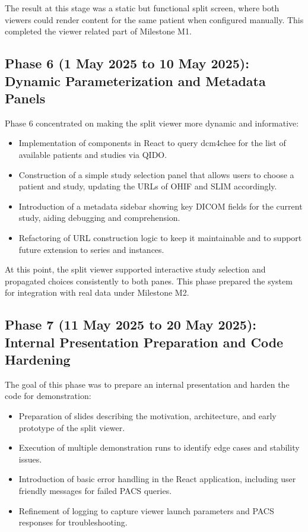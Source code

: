 \documentclass[11pt,a4paper]{article}
\begin{document}
The result at this stage was a static but functional split screen, where both viewers could render content for the same patient when configured manually. This completed the viewer related part of Milestone M1.

\subsection*{Phase 6 (1 May 2025 to 10 May 2025): Dynamic Parameterization and Metadata Panels}

Phase 6 concentrated on making the split viewer more dynamic and informative:

\begin{itemize}
    \item Implementation of components in React to query dcm4chee for the list of available patients and studies via QIDO.
    \item Construction of a simple study selection panel that allows users to choose a patient and study, updating the URLs of OHIF and SLIM accordingly.
    \item Introduction of a metadata sidebar showing key DICOM fields for the current study, aiding debugging and comprehension.
    \item Refactoring of URL construction logic to keep it maintainable and to support future extension to series and instances.
\end{itemize}

At this point, the split viewer supported interactive study selection and propagated choices consistently to both panes. This phase prepared the system for integration with real data under Milestone M2.

\subsection*{Phase 7 (11 May 2025 to 20 May 2025): Internal Presentation Preparation and Code Hardening}

The goal of this phase was to prepare an internal presentation and harden the code for demonstration:

\begin{itemize}
    \item Preparation of slides describing the motivation, architecture, and early prototype of the split viewer.
    \item Execution of multiple demonstration runs to identify edge cases and stability issues.
    \item Introduction of basic error handling in the React application, including user friendly messages for failed PACS queries.
    \item Refinement of logging to capture viewer launch parameters and PACS responses for troubleshooting.
\end{itemize}
\end{document}
